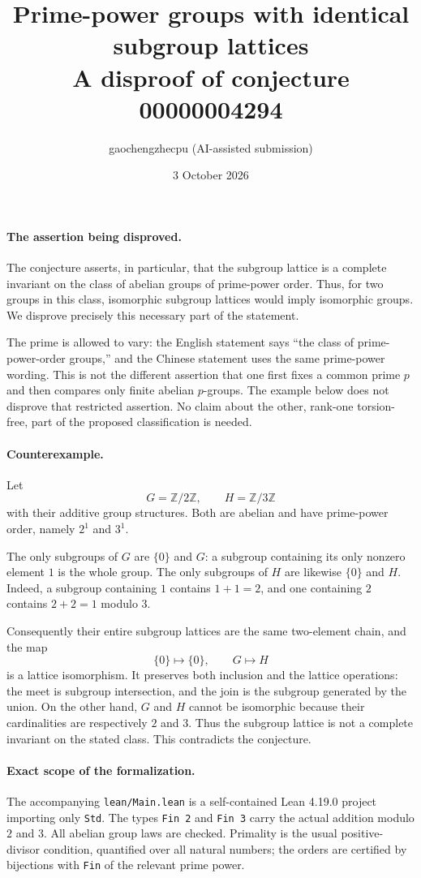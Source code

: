 \documentclass[10pt]{article}
\title{Prime-power groups with identical subgroup lattices\\A disproof of conjecture 00000004294}
\author{gaochengzhecpu (AI-assisted submission)}
\date{3 October 2026}
\begin{document}
\maketitle

\paragraph{The assertion being disproved.}
The conjecture asserts, in particular, that the subgroup lattice is a complete invariant on the class of abelian groups of prime-power order. Thus, for two groups in this class, isomorphic subgroup lattices would imply isomorphic groups. We disprove precisely this necessary part of the statement.

The prime is allowed to vary: the English statement says ``the class of prime-power-order groups,'' and the Chinese statement uses the same prime-power wording. This is not the different assertion that one first fixes a common prime $p$ and then compares only finite abelian $p$-groups. The example below does not disprove that restricted assertion. No claim about the other, rank-one torsion-free, part of the proposed classification is needed.

\paragraph{Counterexample.}
Let
\[
 G=\mathbb Z/2\mathbb Z,\qquad H=\mathbb Z/3\mathbb Z
\]
with their additive group structures. Both are abelian and have prime-power order, namely $2^1$ and $3^1$.

The only subgroups of $G$ are $\{0\}$ and $G$: a subgroup containing its only nonzero element $1$ is the whole group. The only subgroups of $H$ are likewise $\{0\}$ and $H$. Indeed, a subgroup containing $1$ contains $1+1=2$, and one containing $2$ contains $2+2=1$ modulo $3$.

Consequently their entire subgroup lattices are the same two-element chain, and the map
\[
 \{0\}\longmapsto\{0\},\qquad G\longmapsto H
\]
is a lattice isomorphism. It preserves both inclusion and the lattice operations: the meet is subgroup intersection, and the join is the subgroup generated by the union. On the other hand, $G$ and $H$ cannot be isomorphic because their cardinalities are respectively $2$ and $3$. Thus the subgroup lattice is not a complete invariant on the stated class. This contradicts the conjecture.

\newpage
\paragraph{Exact scope of the formalization.}
The accompanying \texttt{lean/Main.lean} is a self-contained Lean 4.19.0 project importing only \texttt{Std}. The types \texttt{Fin 2} and \texttt{Fin 3} carry the actual addition modulo $2$ and $3$. All abelian group laws are checked. Primality is the usual positive-divisor condition, quantified over all natural numbers; the orders are certified by bijections with \texttt{Fin} of the relevant prime power.
\end{document}
